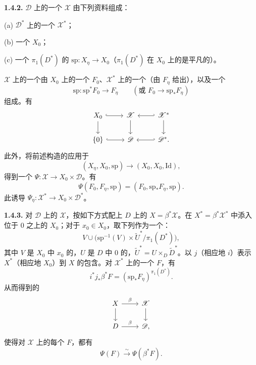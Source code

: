\textbf{1.4.2.} $\mathscr D$ 上的一个 $\mathscr X$ 由下列资料组成：

(a) $\mathscr D^*$ 上的一个 $\mathscr X^*$；

(b) 一个 $X_0$；

(c) 一个 $\pi_1(D^*)$ 的 $\mathrm{sp}:X_\eta\to X_0$（$\pi_1(D^*)$ 在 $X_0$ 上的是平凡的）。

$\mathscr X$ 上的一个由 $X_0$ 上的一个 $F_0$、$\mathscr X^*$ 上的一个（由 $F_\eta$ 给出），以及一个
\[
 \mathrm{sp}:\mathrm{sp}^*F_0\longrightarrow F_\eta
 \qquad(\text{或 }F_0\longrightarrow\mathrm{sp}_*F_\eta)
\]
组成。有
\[
\begin{tikzcd}
X_0\arrow[r,hook]\arrow[d]&\mathscr X\arrow[d]&\mathscr X^*\arrow[l,hook']\arrow[d]\\
\{0\}\arrow[r,hook]&\mathscr D&\mathscr D^*\arrow[l,hook'].
\end{tikzcd}
\]
此外，将前述构造的应用于
\[
 (X_\eta,X_0,\mathrm{sp})\longrightarrow(X_0,X_0,\mathrm{Id}),
\]
得到一个 $\Psi:\mathscr X\to X_0\times\mathscr D$。有
\[
 \Psi(F_0,F_\eta,\mathrm{sp})=(F_0,\mathrm{sp}_*F_\eta,\mathrm{sp}).
\]
此诱导 $\Psi_\eta:\mathscr X^*\to X_0\times\mathscr D^*$。

\textbf{1.4.3.} 对 $\mathscr D$ 上的 $\mathscr X$，按如下方式配上 $D$ 上的 $X=\beta^*\mathscr X$。在 $X^*=\beta^*\mathscr X^*$ 中添入位于 $0$ 之上的 $X_0$；对于 $x_0\in X_0$，取下列作为一个：
\[
 V\cup\bigl(\mathrm{sp}^{-1}(V)\times\widetilde U^*/\pi_1(D^*)\bigr),
\]
其中 $V$ 是 $X_0$ 中 $x_0$ 的，$U$ 是 $D$ 中 $0$ 的，$\widetilde U^*=U\times_D\widetilde D^*$。以 $j$（相应地 $i$）表示 $X^*$（相应地 $X_0$）到 $X$ 的包含。对 $\mathscr X^*$ 上的一个 $F$，有
\[
 i^*j_*\beta^*F=(\mathrm{sp}_*F_\eta)^{\pi_1(D^*)}.
\]
从而得到的
\[
\begin{tikzcd}
X\arrow[r,"\beta"]\arrow[d]&\mathscr X\arrow[d]\\
D\arrow[r,"\beta"]&\mathscr D,
\end{tikzcd}
\]
使得对 $\mathscr X$ 上的每个 $F$，都有
\[
 \Psi(F)\xrightarrow{\sim}\Psi(\beta^*F).\tag{1.4.3.1}
\]

